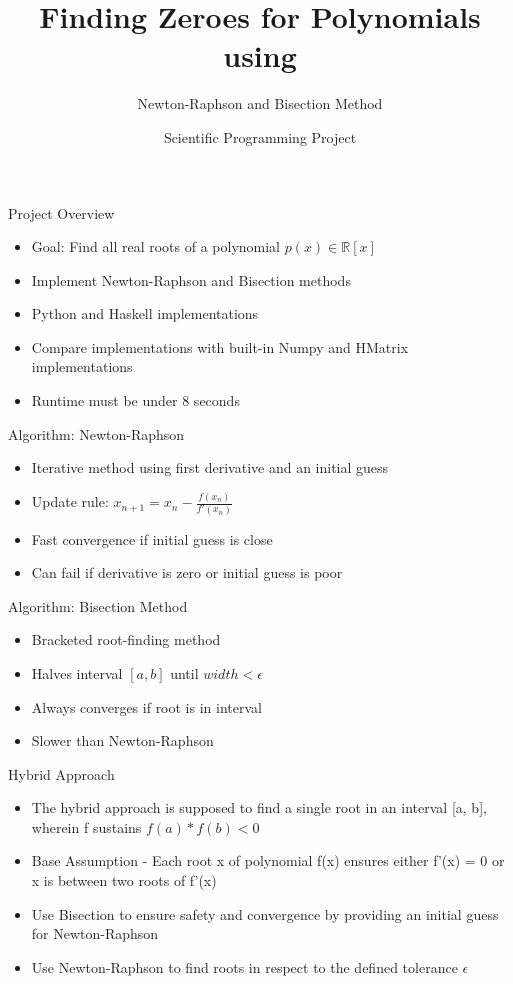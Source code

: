 \documentclass{beamer}
\title{Finding Zeroes for Polynomials using}
\subtitle{Newton-Raphson and Bisection Method}
\author{Scientific Programming Project}
\begin{document}
\frame{\titlepage}

\begin{frame}{Project Overview}
\begin{itemize}
    \item Goal: Find all real roots of a polynomial \( p(x) \in \mathbb{R}[x] \)
    \item Implement Newton-Raphson and Bisection methods
    \item Python and Haskell implementations
    \item Compare implementations with built-in Numpy and HMatrix implementations
    \item Runtime must be under 8 seconds
\end{itemize}
\end{frame}

\begin{frame}{Algorithm: Newton-Raphson}
\begin{itemize}
    \item Iterative method using first derivative and an initial guess
    \item Update rule: \( x_{n+1} = x_n - \frac{f(x_n)}{f'(x_n)} \)
    \item Fast convergence if initial guess is close
    \item Can fail if derivative is zero or initial guess is poor
\end{itemize}
\end{frame}

\begin{frame}{Algorithm: Bisection Method}
\begin{itemize}
    \item Bracketed root-finding method
    \item Halves interval \([a, b]\) until $width < \epsilon\ $ \
    \item Always converges if root is in interval
    \item Slower than Newton-Raphson
\end{itemize}
\end{frame}

\begin{frame}{Hybrid Approach}
\begin{itemize}
    \item The hybrid approach is supposed to find a single root in an interval [a, b], wherein f sustains $f(a)*f(b) < 0 $
    \item Base Assumption - Each root x of polynomial f(x) ensures either f'(x) = 0 or x is between two roots of f'(x)
    \item Use Bisection to ensure safety and convergence by providing an initial guess for Newton-Raphson
    \item Use Newton-Raphson to find roots in respect to the defined tolerance $\epsilon\ $ \
\end{itemize}
\end{frame}
\end{document}
